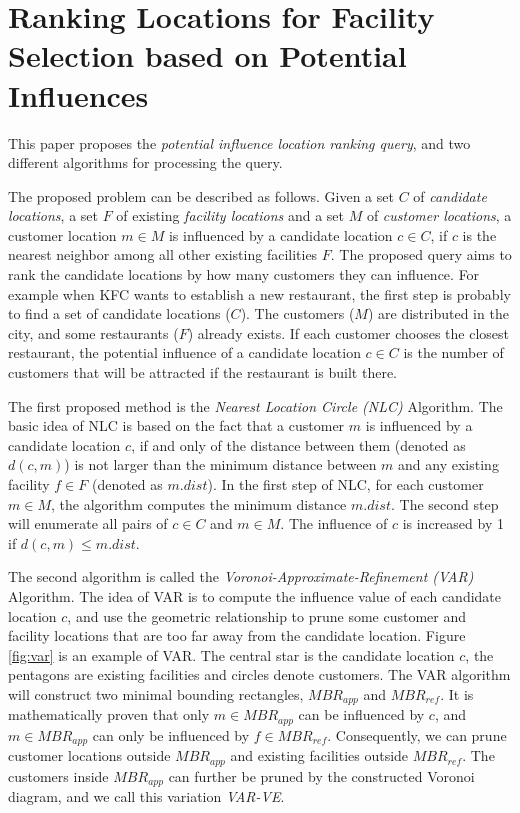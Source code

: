 \documentclass[paper=a4, fontsize=18pt]{article} %
\numberwithin{equation}{section} %
\numberwithin{figure}{section} %
\numberwithin{table}{section} %
\begin{document}
\section{Ranking Locations for Facility Selection based on Potential Influences \cite{HWPTXZ11}} \label{sec:influ_rank}

This paper proposes the \emph{potential influence location ranking query}, and two different algorithms for processing the query.

The proposed problem can be described as follows. Given a set $C$ of \emph{candidate locations}, a set $F$ of existing \emph{facility locations} and a set $M$ of \emph{customer locations}, a customer location $m \in M$ is influenced by a candidate location $c \in C$, if $c$ is the nearest neighbor among all other existing facilities $F$. The proposed query aims to rank the candidate locations by how many customers they can influence. For example when KFC wants to establish a new restaurant, the first step is probably to find a set of candidate locations ($C$). The customers ($M$) are distributed in the city, and some restaurants ($F$) already exists. If each customer chooses the closest restaurant, the potential influence of a candidate location $c \in C$ is the number of customers that will be attracted if the restaurant is built there.

The first proposed method is the \emph{Nearest Location Circle (NLC)} Algorithm. The basic idea of NLC is based on the fact that a customer $m$ is influenced by a candidate location $c$, if and only of the distance between them (denoted as $d(c,m)$) is not larger than the minimum distance between $m$ and any existing facility $f \in F$ (denoted as $m.dist$). In the first step of NLC, for each customer $m \in M$, the algorithm computes the minimum distance $m.dist$. The second step will enumerate all pairs of $c \in C$ and $m \in M$. The influence of $c$ is increased by 1 if $d(c,m) \leq m.dist$.

The second algorithm is called the \emph{Voronoi-Approximate-Refinement (VAR)} Algorithm. The idea of VAR is to compute the influence value of each candidate location $c$, and use the geometric relationship to prune some customer and facility locations that are too far away from the candidate location. Figure \ref{fig:var} is an example of VAR. The central star is the candidate location $c$, the pentagons are existing facilities and circles denote customers. The VAR algorithm will construct two minimal bounding rectangles, $MBR_{app}$ and $MBR_{ref}$. It is mathematically proven that only $m \in MBR_{app}$ can be influenced by $c$, and $m \in MBR_{app}$ can only be influenced by $f \in MBR_{ref}$. Consequently, we can prune customer locations outside $MBR_{app}$ and existing facilities outside $MBR_{ref}$. The customers inside $MBR_{app}$ can further be pruned by the constructed Voronoi diagram, and we call this variation \emph{VAR-VE}.
\end{document}
